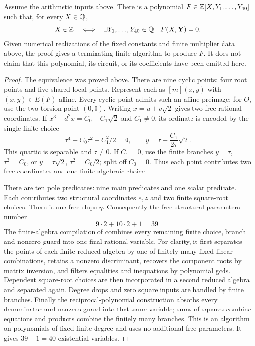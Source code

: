\begin{sdtheorem}\label{sd:forty}
Assume the arithmetic inputs above. There is a polynomial
$F\in\mathbb Z[X,Y_1,\ldots,Y_{40}]$ such that, for every $X\in\mathbb Q$,
\[
 X\in\mathbb Z\quad\Longleftrightarrow\quad
 \exists Y_1,\ldots,Y_{40}\in\mathbb Q\quad F(X,\mathbf Y)=0.
\]
Given numerical realizations of the fixed constants and finite multiplier
data above, the proof gives a terminating finite algorithm to produce $F$.
It does not claim that this polynomial, its circuit, or its coefficients
have been emitted here.
\end{sdtheorem}
\begin{proof}
The equivalence was proved above. There are nine cyclic points: four root
points and five shared local points. Represent each as $[m](x,y)$ with
$(x,y)\in E(F)$ affine. Every cyclic point admits such an affine preimage;
for $O$, use the two-torsion point $(0,0)$.
Writing $x=u+v\sqrt2$ gives two free rational coordinates. If
$x^3-d^2x=C_0+C_1\sqrt2$ and $C_1\ne0$, its ordinate is encoded by the
single finite choice
\[
 \tau^4-C_0\tau^2+C_1^2/2=0,\qquad
 y=\tau+\frac{C_1}{2\tau}\sqrt2.
\]
This quartic is separable and $\tau\ne0$. If $C_1=0$, use the finite
branches $y=\tau$, $\tau^2=C_0$, or $y=\tau\sqrt2$, $\tau^2=C_0/2$;
split off $C_0=0$. Thus each point contributes two free coordinates and
one finite algebraic choice.

There are ten pole predicates: nine main predicates and one scalar
predicate. Each contributes two structural coordinates $e,z$ and two
finite square-root choices. There is one free slope $\eta$.
Consequently the free structural parameters number
\[
                     9\cdot2+10\cdot2+1=39.
\]
The finite-algebra compilation of \cite[Section~10]{Sun2026} combines
every remaining finite choice, branch and nonzero guard into one final
rational variable. For clarity, it first separates the points of each
finite reduced algebra by one of finitely many fixed linear combinations,
retains a nonzero discriminant, recovers the component roots by matrix
inversion, and filters equalities and inequations by polynomial gcds.
Dependent square-root choices are then incorporated in a second reduced
algebra and separated again. Degree drops and zero square inputs are
handled by finite branches. Finally the reciprocal-polynomial construction
absorbs every denominator and nonzero guard into that same variable;
sums of squares combine equations and products combine the finitely many
branches. This is an algorithm on polynomials of fixed finite degree and
uses no additional free parameters. It gives $39+1=40$ existential variables.
\end{proof}

